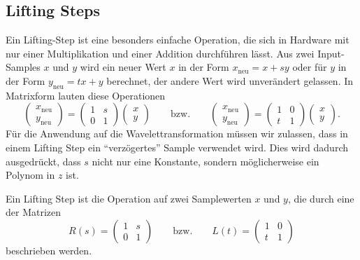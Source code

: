 \subsection{Lifting Steps}
Ein Lifting-Step ist eine besonders einfache Operation, die sich in
Hardware mit nur einer Multiplikation und einer Addition durchführen lässt.
Aus zwei Input-Samples $x$ und $y$ wird ein neuer Wert $x$ 
in der Form $x_{\text{neu}}=x+sy$ oder für $y$ in der Form
$y_{\text{neu}}=tx+y$ berechnet, der andere Wert wird unverändert
gelassen.
In Matrixform lauten diese Operationen
\[
\begin{pmatrix} x_{\text{neu}}\\y_{\text{neu}} \end{pmatrix}
=
\begin{pmatrix} 1&s \\ 0&1\end{pmatrix}
\begin{pmatrix}x\\y\end{pmatrix}
\qquad\text{bzw.}\qquad
\begin{pmatrix} x_{\text{neu}}\\y_{\text{neu}} \end{pmatrix}
=
\begin{pmatrix} 1&0 \\ t&1\end{pmatrix}
\begin{pmatrix}x\\y\end{pmatrix}.
\]
Für die Anwendung auf die Wavelettransformation müssen wir zulassen,
dass in einem Lifting Step ein ``verzögertes'' Sample verwendet wird.
Dies wird dadurch ausgedrückt, dass $s$ nicht nur eine Konstante,
sondern möglicherweise ein Polynom in $z$ ist.

\begin{definition}
Ein Lifting Step ist die Operation auf zwei Samplewerten $x$ und $y$,
die durch eine der Matrizen
\[
R(s)
=
\begin{pmatrix}
1&s\\
0&1
\end{pmatrix}
\qquad\text{bzw.}\qquad
L(t)
=
\begin{pmatrix}
1&0\\
t&1
\end{pmatrix}
\]
beschrieben werden.
\end{definition}

